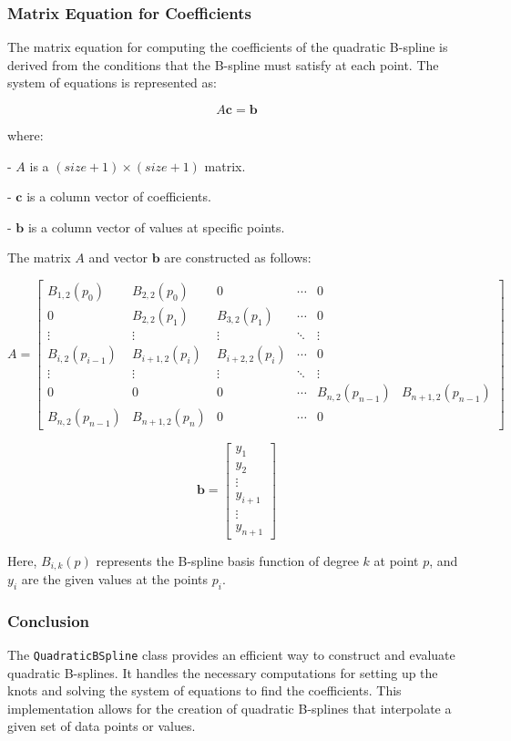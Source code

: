 \documentclass{article}
\begin{document}
\subsubsection{Matrix Equation for Coefficients}
The matrix equation for computing the coefficients of the quadratic B-spline is derived from the conditions that the B-spline must satisfy at each point. The system of equations is represented as:

\[ A \mathbf{c} = \mathbf{b} \]

where:\par
- \( A \) is a \( (size + 1) \times (size + 1) \) matrix.\par
- \( \mathbf{c} \) is a column vector of coefficients.\par
- \( \mathbf{b} \) is a column vector of values at specific points.\par

The matrix \( A \) and vector \( \mathbf{b} \) are constructed as follows:

\[ A = \begin{bmatrix}
B_{1,2}(p_0) & B_{2,2}(p_0) & 0 & \cdots & 0 \\
0 & B_{2,2}(p_1) & B_{3,2}(p_1) & \cdots & 0 \\
\vdots & \vdots & \vdots & \ddots & \vdots \\
B_{i,2}(p_{i-1}) & B_{i+1,2}(p_i) & B_{i+2,2}(p_i) & \cdots & 0 \\
\vdots & \vdots & \vdots & \ddots & \vdots \\
0 & 0 & 0 & \cdots & B_{n,2}(p_{n-1}) & B_{n+1,2}(p_{n-1}) \\
B_{n,2}(p_{n-1}) & B_{n+1,2}(p_n) & 0 & \cdots & 0
\end{bmatrix} \]

\[ \mathbf{b} = \begin{bmatrix}
y_1 \\
y_2 \\
\vdots \\
y_{i+1} \\
\vdots \\
y_{n+1}
\end{bmatrix} \]

Here, \( B_{i,k}(p) \) represents the B-spline basis function of degree \( k \) at point \( p \), and \( y_i \) are the given values at the points \( p_i \).

\subsubsection{Conclusion}
The \texttt{QuadraticBSpline} class provides an efficient way to construct and evaluate quadratic B-splines. It handles the necessary computations for setting up the knots and solving the system of equations to find the coefficients. This implementation allows for the creation of quadratic B-splines that interpolate a given set of data points or values.
\end{document}
